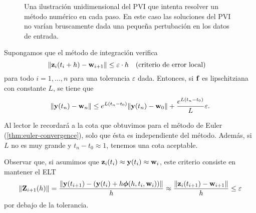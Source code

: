 \begin{figure}[h]
    \centering
    \caption{Una ilustración unidimensional del PVI que intenta resolver
    un método numérico en cada paso.
    En este caso las soluciones del PVI no varían bruscamente
    dada una pequeña pertubación en los datos de entrada.}
    \label{fig:local-sol}
\end{figure}

\begin{theorem}\label{thm:global-err}
    Supongamos que el método de integración verifica
    \begin{equation*}
        \norm{\vz_i(t_i + h) - \vw_{i+1}} \leq \varepsilon\cdot h
            \qq{(criterio de error local)}
    \end{equation*}
    para todo $i = 1,\ldots,n$ para una tolerancia $\varepsilon$ dada.
    Entonces, si $\vb{f}$ es lipschitziana con constante $L$, se tiene que 
    \begin{equation*}
        \norm{\vb{y}(t_n) - \vb{w}_n} \leq e^{L(t_n - t_0)}\norm{\vb{y}(t_n) - \vb{w}_0}
            + \frac{e^{L(t_n - t_0)}}{L}\varepsilon.
    \end{equation*}
\end{theorem}

\begin{remark}
    Al lector le recordará a la cota que obtuvimos para el método de Euler
    (\cref{thm:euler-convergence}),
    solo que ésta es independiente del método.
    Además, si $L$ no es muy grande y $t_n - t_0 \approx 1$,
    tenemos una cota aceptable.
\end{remark}

\begin{remark}
    Observar que, si asumimos que $\vb{z}_i(t_i) \approx \vb{y}(t_i) \approx \vb{w}_i $,
    este criterio consiste en mantener el ELT
    \begin{equation*}
        \norm{\vb{Z}_{i+1}(h)} =
        \frac{\norm{\vb{y}(t_{i+1}) - (\vb{y}(t_i) + h\vb*{\phi}(h, t_i, \vb{w}_i))}}{h}
        \approx \frac{\norm{\vb{z}_i(t_{i+1}) - \vb{w}_{i+1}}}{h} \le \varepsilon
    \end{equation*}
    por debajo de la tolerancia.
\end{remark}


